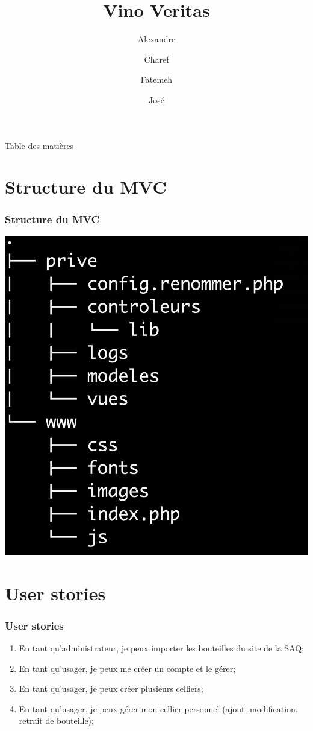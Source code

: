 \documentclass{beamer}
\title{Vino Veritas}
\author{Alexandre \and Charef \and Fatemeh \and José }
\begin{document}
 
\frame{\titlepage}

\begin{frame}{Table des matières}
\tableofcontents
\end{frame}


\section{Structure du MVC}
\begin{frame}
\frametitle{Structure du MVC}
\includegraphics[width=.8\textheight]{tree}
\end{frame}


\section{User stories}
\begin{frame}
\frametitle{User stories}
\begin{enumerate}
	\item En tant qu’administrateur, je peux importer les bouteilles du site de la SAQ;
	\item En tant qu’usager, je peux me créer un compte et le gérer;
	\item En tant qu’usager, je peux créer plusieurs celliers;
	\item En tant qu’usager, je peux gérer mon cellier personnel (ajout, modification, retrait de bouteille);
\end{enumerate}
\end{frame}
\end{document}
